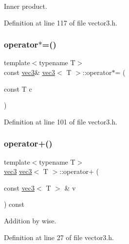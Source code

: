 Inner product. 



Definition at line 117 of file vector3.\+h.

\mbox{\label{structvec3_a7989a4ee0a46d2ec4286795ab6852636}} 
\subsubsection{\texorpdfstring{operator$\ast$=()}{operator*=()}}
{\footnotesize\ttfamily template$<$typename T$>$ \\
const \mbox{\hyperlink{structvec3}{vec3}}\& \mbox{\hyperlink{structvec3}{vec3}}$<$ T $>$\+::operator$\ast$= (\begin{DoxyParamCaption}\item[{const T}]{c }\end{DoxyParamCaption})\hspace{0.3cm}{\ttfamily [inline]}}



Definition at line 101 of file vector3.\+h.

\mbox{\label{structvec3_a255037f59863e54390e388dd07e7ee8f}} 
\subsubsection{\texorpdfstring{operator+()}{operator+()}\hspace{0.1cm}{\footnotesize\ttfamily [1/2]}}
{\footnotesize\ttfamily template$<$typename T$>$ \\
\mbox{\hyperlink{structvec3}{vec3}} \mbox{\hyperlink{structvec3}{vec3}}$<$ T $>$\+::operator+ (\begin{DoxyParamCaption}\item[{const \mbox{\hyperlink{structvec3}{vec3}}$<$ T $>$ \&}]{v }\end{DoxyParamCaption}) const\hspace{0.3cm}{\ttfamily [inline]}}



Addition by wise. 



Definition at line 27 of file vector3.\+h.

